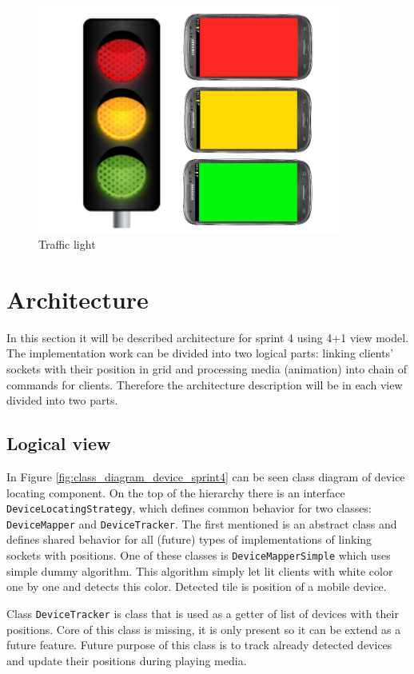 \begin{figure}[h]
	\centering
		\includegraphics[width=10cm]{sprint4/trafficlight.png}
	\caption{Traffic light}
	\label{fig:trafficlight}
\end{figure}

\section{Architecture}
In this section it will be described architecture for sprint 4 using 4+1 view model.
The implementation work can be divided into two logical parts: linking clients' sockets with their position in grid and processing media (animation) into chain of commands for clients.
Therefore the architecture description will be in each view divided into two parts.

\subsection{Logical view}
In Figure \ref{fig:class_diagram_device_sprint4} can be seen class diagram of device locating component.
On the top of the hierarchy there is an interface \texttt{DeviceLocatingStrategy}, which defines common behavior for two classes: \texttt{DeviceMapper} and \texttt{DeviceTracker}.
The first mentioned is an abstract class and defines shared behavior for all (future) types of implementations of linking sockets with positions.
One of these classes is \texttt{DeviceMapperSimple} which uses simple dummy algorithm.
This algorithm simply let lit clients with white color one by one and detects this color.
Detected tile is position of a mobile device.

Class \texttt{DeviceTracker} is class that is used as a getter of list of devices with their positions.
Core of this class is missing, it is only present so it can be extend as a future feature.
Future purpose of this class is to track already detected devices and update their positions during playing media.

